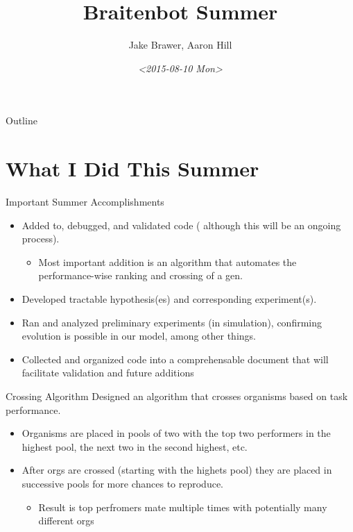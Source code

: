 \documentclass[aspectratio=169]{beamer}
\author{Jake Brawer, Aaron Hill}
\date{\textit{<2015-08-10 Mon>}}
\title{Braitenbot Summer}
\begin{document}
\maketitle
\begin{frame}{Outline}
\tableofcontents
\end{frame}

\section{What I Did This Summer}
\label{sec-1}
\begin{frame}[label=sec-1-1]{Important Summer Accomplishments}
\begin{itemize}
\item Added to, debugged, and validated code ( although this will be an ongoing process).
\begin{itemize}
\item Most important addition is an algorithm that automates the performance-wise ranking and crossing of a gen.
\end{itemize}
\item Developed tractable hypothesis(es) and corresponding experiment(s).
\item Ran and analyzed preliminary experiments (in simulation), confirming evolution is possible in our model, among other things.
\item Collected and organized code into a comprehensable document that will facilitate validation and future additions
\end{itemize}
\end{frame}

\begin{frame}[label=sec-1-2]{Crossing Algorithm}
Designed an algorithm that crosses organisms based on task performance.
\begin{itemize}
\item Organisms are placed in pools of two with the top two performers in the highest pool, the next two in the second highest, etc.
\item After orgs are crossed (starting with the highets pool) they are placed in successive pools for more chances to reproduce.
\begin{itemize}
\item Result is top perfromers mate multiple times with potentially many different orgs
\end{itemize}
\end{itemize}
\end{frame}
\end{document}

